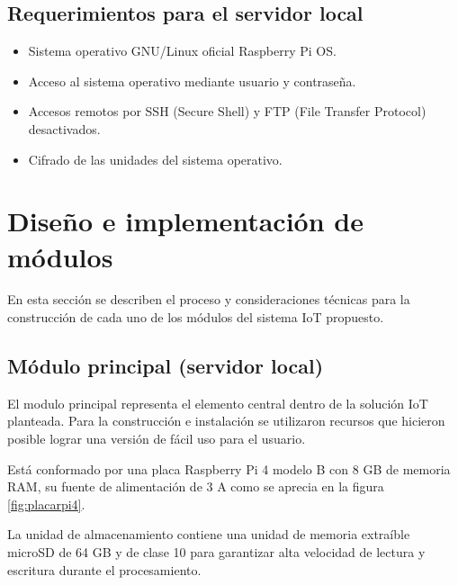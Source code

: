 \subsection{Requerimientos para el servidor local}

\begin{itemize}
\item Sistema operativo GNU/Linux oficial Raspberry Pi OS.
\item Acceso al sistema operativo mediante usuario y contraseña.
\item Accesos remotos por SSH (Secure Shell) y FTP (File Transfer Protocol)  desactivados.
\item Cifrado de las unidades del sistema operativo.
\end{itemize}

\section{Diseño e implementación de módulos}

En esta sección se describen el proceso y consideraciones técnicas para la construcción de cada uno de los módulos del sistema IoT propuesto.

\subsection{Módulo principal (servidor local)}

El modulo principal representa el elemento central dentro de la solución IoT planteada. Para la construcción e instalación se utilizaron recursos que hicieron posible lograr una versión de fácil uso para el usuario.

Está conformado por una placa Raspberry Pi 4 modelo B con 8 GB de memoria RAM, su fuente de alimentación de 3 A como se aprecia en la figura \ref{fig:placarpi4}.

La unidad de almacenamiento contiene una unidad de memoria extraíble microSD de 64 GB y de clase 10 para garantizar alta velocidad de lectura y escritura durante el procesamiento.

